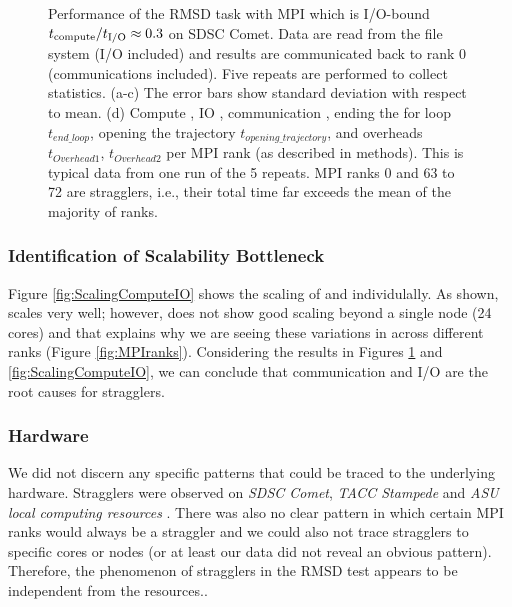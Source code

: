 \begin{figure}[ht!]
\caption{Performance of the RMSD task with MPI which is I/O-bound ${t}_{\text{compute}}/{t}_{\text{I/O}} \approx 0.3$ on SDSC Comet.
Data are read from the file system (I/O included) and results are communicated back to
rank 0 (communications included). Five repeats are performed to collect statistics. (a-c) The error bars show
standard deviation with respect to mean. (d) Compute \tcomp, IO \tIO, communication \tcomm, ending the for loop $t_{end\_loop}$,
  opening the trajectory $t_{opening\_trajectory}$, and overheads $t_{Overhead1}$,  $t_{Overhead2}$ per MPI rank (as described in methods).
  This is typical data from one run of the 5 repeats. MPI ranks 0 and 63 to 72 are stragglers, i.e., their total time 
far exceeds the mean of the majority of ranks.}
  
\label{fig:MPIwithIO}
\end{figure} 

\subsubsection*{Identification of Scalability Bottleneck}

Figure \ref{fig:ScalingComputeIO} shows the scaling of \tcomp and \tIO individulally. 
As shown, \tcomp scales very well; however, \tIO does not show good scaling beyond a single node (24 cores) and that explains why we are seeing these variations in \tIO across different ranks (Figure \ref{fig:MPIranks}). 
Considering the results in Figures \ref{fig:MPIwithIO} and \ref{fig:ScalingComputeIO}, we can conclude that communication and I/O are the root causes for stragglers. 

\subsubsection*{Hardware}
 
We did not discern any specific patterns that could be traced to the underlying hardware. Stragglers were observed on \emph{SDSC Comet},
\emph{TACC Stampede} and \emph{ASU local computing resources} \cite{Khoshlessan:2017ab}. There was also no clear pattern in which certain MPI
ranks would always be a straggler and we could also not trace stragglers to specific cores or nodes (or at least our data did not
reveal an obvious pattern). Therefore, the phenomenon of stragglers in the RMSD test appears to be independent from the resources..

